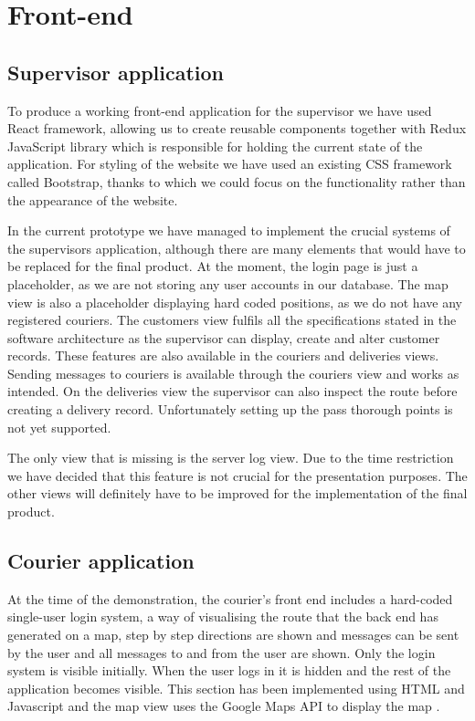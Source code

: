 

\section{Front-end}
\subsection{Supervisor application}
To produce a working front-end application for the supervisor we have used React\cite{React} framework, allowing us to create reusable components together with Redux\cite{Redux} JavaScript library which is responsible for holding the current state of the application. For styling of the website we have used an existing CSS framework called Bootstrap\cite{Bootstrap}, thanks to which we could focus on the functionality rather than the appearance of the website.

In the current prototype we have managed to implement the crucial systems of the supervisors application, although there are many elements that would have to be replaced for the final product. At the moment, the login page is just a placeholder, as we are not storing any user accounts in our database. The map view is also a placeholder displaying hard coded positions, as we do not have any registered couriers. The customers view fulfils all the specifications stated in the software architecture as the supervisor can display, create and alter customer records. These features are also available in the couriers and deliveries views. Sending messages to couriers is available through the couriers view and works as intended. On the deliveries view the supervisor can also inspect the route before creating a delivery record. Unfortunately setting up the pass thorough points is not yet supported.

The only view that is missing is the server log view. Due to the time restriction we have decided that this feature is not crucial for the presentation purposes. The other views will definitely have to be improved for the implementation of the final product.
\subsection{Courier application}
At the time of the demonstration, the courier’s front end includes a hard-coded single-user login system, a way of visualising the route that the back end has generated on a map, step by step directions are shown and messages can be sent by the user and all messages to and from the user are shown. Only the login system is visible initially. When the user logs in it is hidden and the rest of the application becomes visible. This section has been implemented using HTML and Javascript and the map view uses the Google Maps API to display the map \cite{MapsAPI}.

